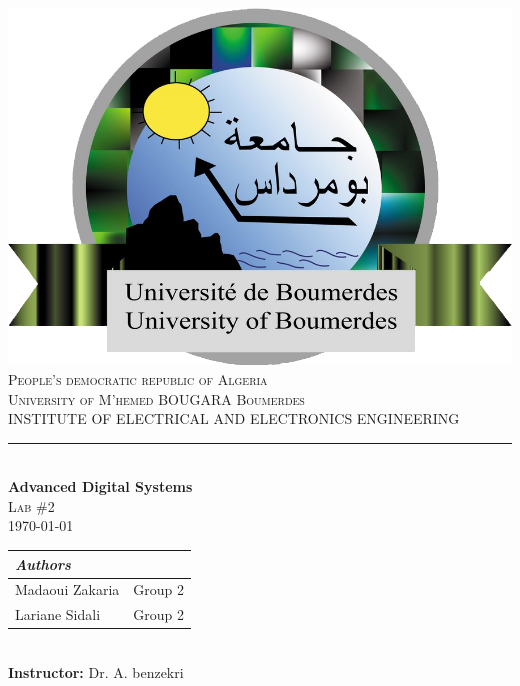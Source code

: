 \documentclass{myDocClass}
\author{Zakaria Madaoui}
\def\labN{2}
\def\course{Advanced Digital Systems}
\def\thetitle{Lab \#\labN}
\def\date{\Large\today}
\def\instructor{Dr. A. benzekri}
\begin{document}
\begin{center}
    \includegraphics[scale = 0.7]{umbb.png}\\[1cm]
    \textsc{\LARGE{People's democratic republic of Algeria}}\\
    \textsc{\LARGE{University of M'hemed BOUGARA Boumerdes}}\\[0.5cm]
    \textsc{\color[RGB]{0, 51, 102}\LARGE{INSTITUTE OF ELECTRICAL AND ELECTRONICS ENGINEERING}}\\
    \rule{\textwidth}{2pt}\\
    \vspace{1cm}
    \textbf{\LARGE{\course}}\\[.5cm]
    \textsc{\LARGE{\thetitle}}\\[.5cm]
    \textsc{\date}\\[2cm]
    
    \Large{
    \begin{tabular}{L{5cm} R{5cm}}
        \textit{Authors}\\
        \hline
        Madaoui Zakaria & Group 2\\
        Lariane Sidali & Group 2
    \end{tabular}\\[1cm]
    \Large\textbf{ Instructor:} \instructor
    }
\end{center}


\thispagestyle{empty}
\pagebreak

\changefontsize[15pt]{12pt}

\tableofcontents{}
\pagebreak
\end{document}
